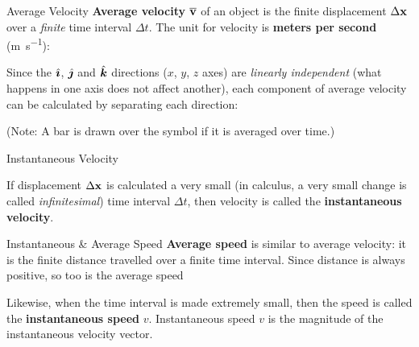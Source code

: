 \documentclass[12pt,compress,aspectratio=169]{beamer}
\newcommand{\iii}{\ensuremath\hat{\bm{\imath}}}
\newcommand{\jjj}{\ensuremath\hat{\bm{\jmath}}}
\newcommand{\kkk}{\ensuremath\hat{\bm{k}}}
\newcommand{\mb}[1]{\ensuremath\mathbf{#1}}
\newcommand{\eq}[2]{\vspace{#1}{\Large\begin{displaymath}#2\end{displaymath}}}
\begin{document}
\begin{frame}{Average Velocity}
  \textbf{Average velocity} $\overline{\mb{v}}$ of an object is the finite
  displacement $\Delta\mb{x}$ over a \emph{finite} time interval $\Delta t$.
  The unit for velocity is \textbf{meters per second} (\si{\metre\per\second}):

  \eq{-.2in}{
    \boxed{
      \overline{\mb{v}}= \frac{\Delta\mb{x}}{\Delta t}
    }
  }
  
  Since the $\iii$, $\jjj$ and $\kkk$ directions ($x$, $y$, $z$ axes) are
  \emph{linearly independent} (what happens in one axis does not affect
  another), each component of average velocity can be calculated by separating
  each direction:

  \eq{-.15in}{
    \boxed{
      \overline{\mb{v}}=
      \frac{\Delta x}{\Delta t}\iii + \frac{\Delta y}{\Delta t}\jjj +
      \frac{\Delta z}{\Delta t}\kkk
    }
  }

  (Note: A bar is drawn over the symbol if it is averaged over time.)
\end{frame}



\begin{frame}{Instantaneous Velocity}

  \eq{0in}{
    \overline{\mb{v}}= \frac{\Delta\mb{x}}{\Delta t}
  }
  
  If displacement $\Delta\mb{x}$ is calculated a very small (in calculus, a very
  small change is called \emph{infinitesimal}) time interval $\Delta t$, then
  velocity is called the \textbf{instantaneous velocity}. 
\end{frame}



\begin{frame}{Instantaneous \& Average Speed}
  \textbf{Average speed} is similar to average velocity: it is the finite
  distance travelled over a finite time interval. Since distance is always
  positive, so too is the average speed
 
  \eq{-.2in}{
    \boxed{\overline{v}=\frac{s}{\Delta t}}
  }

  Likewise, when the time interval is made extremely small, then the speed is
  called the \textbf{instantaneous speed} $v$. Instantaneous speed $v$ is the
  magnitude of the instantaneous velocity vector.
\end{frame}



\end{document}
